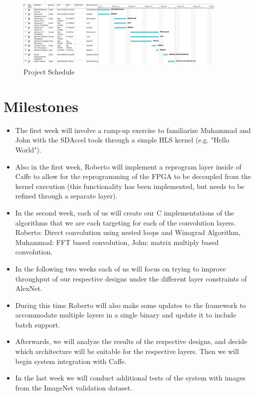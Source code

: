 \documentclass[conference,compsoc]{IEEEtran/IEEEtran}
\begin{document}
\begin{figure}[ht]
    \centering
    \includegraphics[width=0.9\textwidth]{gantt_chart.png}
    \caption{Project Schedule}
    \label{fig:gantt}
\end{figure}

\section{Milestones}\label{section:milestones}

\begin{itemize}
    \item The first week will involve a ramp-up exercise to familiarize Muhammad and John with
	the SDAccel tools through a simple HLS kernel (e.g. "Hello World").
    \item Also in the first week, Roberto will implement a reprogram layer inside of Caffe to
	allow for the reprogramming of the FPGA to be decoupled from the kernel execution
	(this functionality has been implemented, but needs to be refined through a separate layer).
    \item In the second week, each of us will create our C implementations of the algorithms
	that we are each targeting for each of the convolution layers. Roberto: Direct convolution
	using nested loops and Winograd Algorithm, Muhammad: FFT based convolution, John: matrix 
	multiply based convolution.
    \item In the following two weeks each of us will focus on trying to improve throughput of our
	respective designs under the different layer constraints of AlexNet.
	\item During this time Roberto will also make some updates to the framework to accommodate
	multiple layers in a single binary and update it to include batch support.
    \item Afterwards, we will analyze the results of the respective designs, and decide which
	architecture will be suitable for the respective layers. Then we will begin system integration
	with Caffe.
    \item In the last week we will conduct additional tests of the system with images from the
	ImageNet validation dataset.
\end{itemize}





\end{document}

